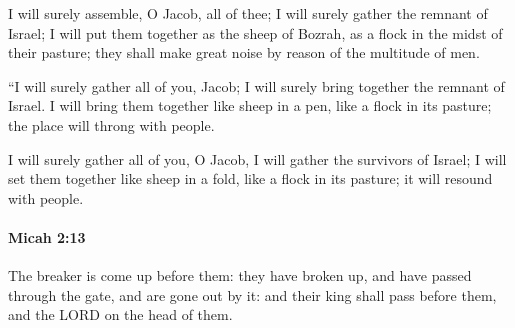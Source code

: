 			\begin{versebox}
					\item[BHS] 
					\item[LXX] 
					\item[ASV] I will surely assemble, O Jacob, all of thee; I will surely gather the remnant of Israel; I will put them together as the sheep of Bozrah, as a flock in the midst of their pasture; they shall make great noise by reason of the multitude of men.
					\item[NIV] “I will surely gather all of you, Jacob; I will surely bring together the remnant of Israel. I will bring them together like sheep in a pen, like a flock in its pasture; the place will throng with people.
					\item[NRSV] I will surely gather all of you, O Jacob, I will gather the survivors of Israel; I will set them together like sheep in a fold, like a flock in its pasture; it will resound with people.
			\end{versebox}

		\paragraph{Micah 2:13} %
			\label{MICAH-2-13}

			The breaker is come up before them: they have broken up, and have passed through the gate, and are gone out by it: and their king shall pass before them, and the LORD on the head of them.

